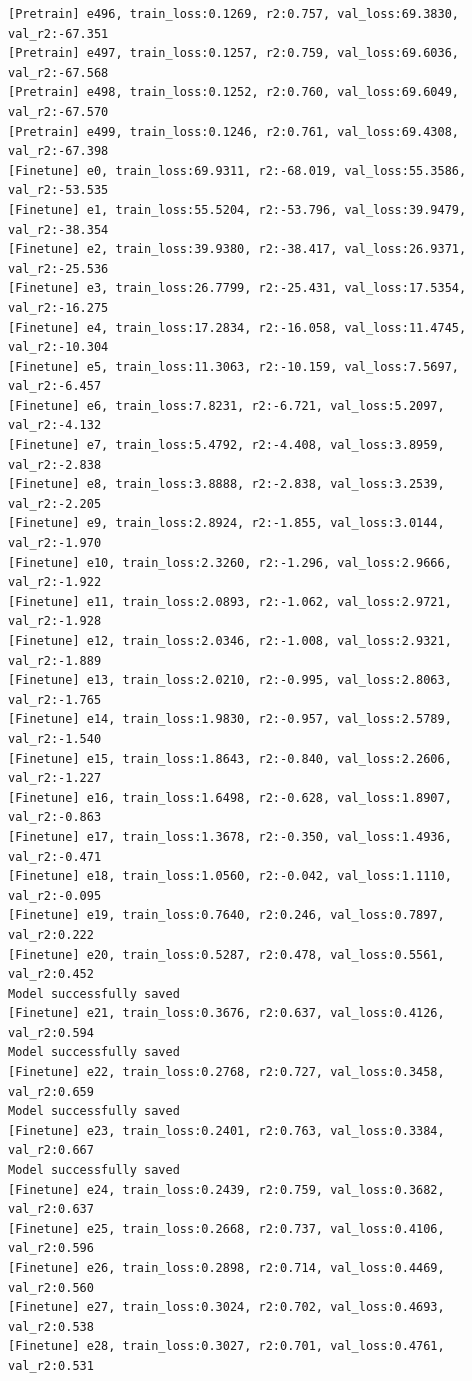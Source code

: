 \documentclass[a4paper, 12pt]{article}
\begin{document}
\begin{lstlisting}
[Pretrain] e496, train_loss:0.1269, r2:0.757, val_loss:69.3830, val_r2:-67.351
[Pretrain] e497, train_loss:0.1257, r2:0.759, val_loss:69.6036, val_r2:-67.568
[Pretrain] e498, train_loss:0.1252, r2:0.760, val_loss:69.6049, val_r2:-67.570
[Pretrain] e499, train_loss:0.1246, r2:0.761, val_loss:69.4308, val_r2:-67.398
[Finetune] e0, train_loss:69.9311, r2:-68.019, val_loss:55.3586, val_r2:-53.535
[Finetune] e1, train_loss:55.5204, r2:-53.796, val_loss:39.9479, val_r2:-38.354
[Finetune] e2, train_loss:39.9380, r2:-38.417, val_loss:26.9371, val_r2:-25.536
[Finetune] e3, train_loss:26.7799, r2:-25.431, val_loss:17.5354, val_r2:-16.275
[Finetune] e4, train_loss:17.2834, r2:-16.058, val_loss:11.4745, val_r2:-10.304
[Finetune] e5, train_loss:11.3063, r2:-10.159, val_loss:7.5697, val_r2:-6.457
[Finetune] e6, train_loss:7.8231, r2:-6.721, val_loss:5.2097, val_r2:-4.132
[Finetune] e7, train_loss:5.4792, r2:-4.408, val_loss:3.8959, val_r2:-2.838
[Finetune] e8, train_loss:3.8888, r2:-2.838, val_loss:3.2539, val_r2:-2.205
[Finetune] e9, train_loss:2.8924, r2:-1.855, val_loss:3.0144, val_r2:-1.970
[Finetune] e10, train_loss:2.3260, r2:-1.296, val_loss:2.9666, val_r2:-1.922
[Finetune] e11, train_loss:2.0893, r2:-1.062, val_loss:2.9721, val_r2:-1.928
[Finetune] e12, train_loss:2.0346, r2:-1.008, val_loss:2.9321, val_r2:-1.889
[Finetune] e13, train_loss:2.0210, r2:-0.995, val_loss:2.8063, val_r2:-1.765
[Finetune] e14, train_loss:1.9830, r2:-0.957, val_loss:2.5789, val_r2:-1.540
[Finetune] e15, train_loss:1.8643, r2:-0.840, val_loss:2.2606, val_r2:-1.227
[Finetune] e16, train_loss:1.6498, r2:-0.628, val_loss:1.8907, val_r2:-0.863
[Finetune] e17, train_loss:1.3678, r2:-0.350, val_loss:1.4936, val_r2:-0.471
[Finetune] e18, train_loss:1.0560, r2:-0.042, val_loss:1.1110, val_r2:-0.095
[Finetune] e19, train_loss:0.7640, r2:0.246, val_loss:0.7897, val_r2:0.222
[Finetune] e20, train_loss:0.5287, r2:0.478, val_loss:0.5561, val_r2:0.452
Model successfully saved
[Finetune] e21, train_loss:0.3676, r2:0.637, val_loss:0.4126, val_r2:0.594
Model successfully saved
[Finetune] e22, train_loss:0.2768, r2:0.727, val_loss:0.3458, val_r2:0.659
Model successfully saved
[Finetune] e23, train_loss:0.2401, r2:0.763, val_loss:0.3384, val_r2:0.667
Model successfully saved
[Finetune] e24, train_loss:0.2439, r2:0.759, val_loss:0.3682, val_r2:0.637
[Finetune] e25, train_loss:0.2668, r2:0.737, val_loss:0.4106, val_r2:0.596
[Finetune] e26, train_loss:0.2898, r2:0.714, val_loss:0.4469, val_r2:0.560
[Finetune] e27, train_loss:0.3024, r2:0.702, val_loss:0.4693, val_r2:0.538
[Finetune] e28, train_loss:0.3027, r2:0.701, val_loss:0.4761, val_r2:0.531

\end{lstlisting}
\end{document}
